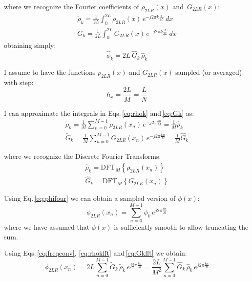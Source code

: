where we recognize the Fourier coefficients of $\rho_{2LR}(x)$ and $\,G_{2LR}(x)$:
\begin{align}
\tilde{\rho}_k = \frac{1}{2L}\int_0^{2L} \rho_{2LR}(x)\, e^{-j2\pi k \frac{x}{2L}} \, dx \label{eq:rhok}\\
\tilde{G}_k = \frac{1}{2L}\int_0^{2L} G_{2LR}(x)\, e^{-j2\pi k \frac{x}{2L}} \, dx \label{eq:Gk}
\end{align}
obtaining simply:
\begin{equation}
\hat{\phi}_k = 2L \, \hat{G}_k \, \hat{\rho}_k
\label{eq:freqconv}
\end{equation}

I assume to have the functions $\rho_{2LR}(x)$ and  $G_{2LR}(x)$ sampled (or averaged) with step:
\begin{equation}
h_x = \frac{2L}{M} = \frac{L}{N}
\end{equation}

I can approximate the integrals in Eqs.\,\eqref{eq:rhok} and\,\eqref{eq:Gk} as:
\begin{align}
\tilde{\rho}_k = \frac{1}{M}\sum_{n=0}^{M-1} \rho_{2LR}(x_n)\, e^{-j2\pi  \frac{kn}{M}}  
= \frac{1}{M} \hat{\rho}_k
\label{eq:rhokfft}\\
\tilde{G}_k = \frac{1}{M}\sum_{n=0}^{M-1} G_{2LR}(x_n)\, e^{-j2\pi  \frac{kn}{M}} 
= \frac{1}{M} \hat{G}_k\label{eq:Gkfft}
\end{align}

where we recognize the Discrete Fourier Transforms:
\begin{align}
\hat{\rho}_k = \text{DFT}_M\left\{ \rho_{2LR}(x_n)\right\}\\
\hat{G}_k = \text{DFT}_M\left\{ G_{2LR}(x_n)\right\}
\end{align}



Using Eq.\,\eqref{eq:phifour} we can obtain a sampled version of $\phi(x)$:
\begin{equation}
\phi_{2LR}(x_n) = 
\sum_{n=0}^{M-1}  
\tilde{\phi}_k\, e^{j2\pi \frac{kn}{M}}
\label{eq:phifft}
\end{equation}
where we have assumed that $\phi(x)$ is sufficiently smooth to allow truncating the sum.


Using Eqs.\,\eqref{eq:freqconv}, \eqref{eq:rhokfft} and\,\eqref{eq:Gkfft}  we obtain:
\begin{equation}
\phi_{2LR}(x_n) = 
2L \sum_{n=0}^{M-1}  
\tilde{G}_k \, \tilde{\rho}_k\, e^{j2\pi \frac{kn}{M}} 
= 
\frac{2L}{M^2}
\sum_{n=0}^{M-1}  
\hat{G}_k \, \hat{\rho}_k\, e^{j2\pi \frac{kn}{M}} 
\label{eq:phifftsimpl}
\end{equation}

